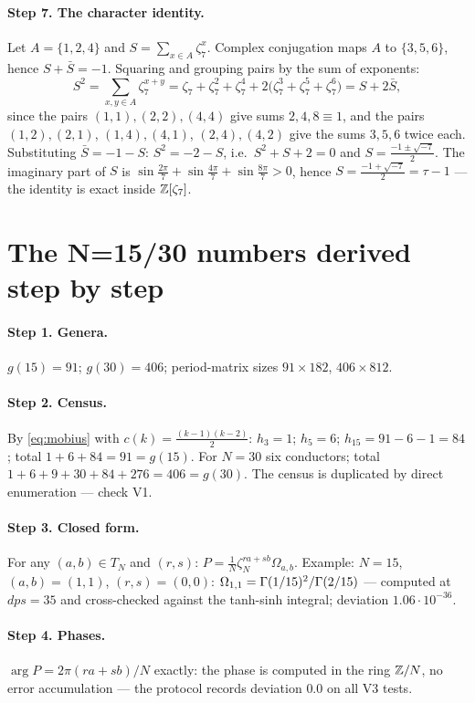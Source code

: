 \paragraph{Step 7. The character identity.} Let $A=\{1,2,4\}$ and
$S=\sum_{x\in A}\zeta_7^x$. Complex conjugation maps $A$ to
$\{3,5,6\}$, hence $S+\bar S=-1$. Squaring and grouping pairs by
the sum of exponents:
\[
  S^2=\sum_{x,y\in A}\zeta_7^{x+y}
  =\zeta_7+\zeta_7^2+\zeta_7^4
  +2\bigl(\zeta_7^3+\zeta_7^5+\zeta_7^6\bigr)
  =S+2\bar S,
\]
since the pairs $(1,1),(2,2),(4,4)$ give sums $2,4,8\equiv1$, and
the pairs $(1,2),(2,1)$, $(1,4),(4,1)$, $(2,4),(4,2)$ give the sums
$3,5,6$ twice each. Substituting $\bar S=-1-S$:
$S^2=-2-S$, i.e.\ $S^2+S+2=0$ and
$S=\frac{-1\pm\sqrt{-7}}{2}$. The imaginary part of $S$ is
$\sin\tfrac{2\pi}{7}+\sin\tfrac{4\pi}{7}+\sin\tfrac{8\pi}{7}>0$,
hence $S=\frac{-1+\sqrt{-7}}{2}=\tau-1$ --- the identity is exact
inside $\mathbb{Z}[\zeta_7]$.

\section{The N=15/30 numbers derived step by step}\label{sec:workfermat}

\paragraph{Step 1. Genera.} $g(15)=91$; $g(30)=406$; period-matrix
sizes $91\times182$, $406\times812$.

\paragraph{Step 2. Census.} By \eqref{eq:mobius} with
$c(k)=\frac{(k-1)(k-2)}2$: $h_3=1$; $h_5=6$;
$h_{15}=91-6-1=84$; total $1+6+84=91=g(15)$. For $N=30$ six
conductors; total $1+6+9+30+84+276=406=g(30)$. The census is
duplicated by direct enumeration --- check V1.

\paragraph{Step 3. Closed form.} For any $(a,b)\in T_N$ and $(r,s)$:
$P=\frac1N\zeta_N^{ra+sb}\Omega_{a,b}$. Example: $N=15$,
$(a,b)=(1,1)$, $(r,s)=(0,0)$:
$\Omega_{1,1}=\Gamma(1/15)^2/\Gamma(2/15)$ --- computed at $dps=35$ and
cross-checked against the tanh-sinh integral; deviation
$1.06\cdot10^{-36}$.

\paragraph{Step 4. Phases.} $\arg P=2\pi(ra+sb)/N$ exactly: the phase
is computed in the ring $\mathbb{Z}/N$, no error accumulation --- the
protocol records deviation $0.0$ on all V3 tests.

